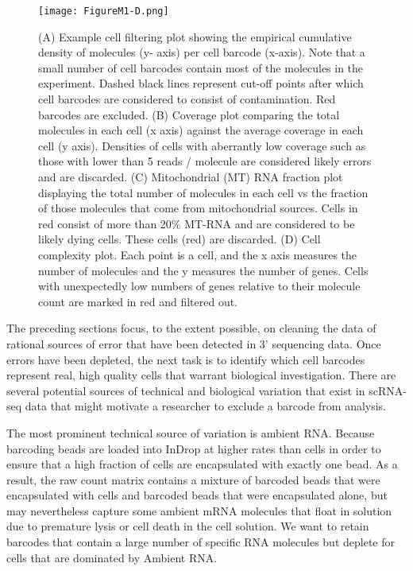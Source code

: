 \begin{figure}
\centering
\texttt{[image: FigureM1-D.png]}
\caption{(A) Example cell filtering plot showing the empirical cumulative density of molecules (y- axis) per cell barcode (x-axis). Note that a small number of cell barcodes contain most of the molecules in the experiment. Dashed black lines represent cut-off points after which cell barcodes are considered to consist of contamination. Red barcodes are excluded.  
(B) Coverage plot comparing the total molecules in each cell (x axis) against the average coverage in each cell (y axis). Densities of cells with aberrantly low coverage such as those with lower than 5 reads / molecule are considered likely errors and are discarded.  
(C) Mitochondrial (MT) RNA fraction plot displaying the total number of molecules in each cell vs the fraction of those molecules that come from mitochondrial sources. Cells in red consist of more than 20\% MT-RNA and are considered to be likely dying cells.  These cells (red) are discarded. 
(D) Cell complexity plot. Each point is a cell, and the x axis measures the number of molecules and the y measures the number of genes. Cells with unexpectedly low numbers of genes relative to their molecule count are marked in red and filtered out.}
\label{fig:m1d}
\end{figure}

The preceding sections focus, to the extent possible,  on cleaning the data of rational sources of error that have been detected in 3' sequencing data. 
Once errors have been depleted, the next task is to identify which cell barcodes represent real, high quality cells that warrant biological investigation. 
There are several potential sources of technical and biological variation that exist in scRNA-seq data that might motivate a researcher to exclude a barcode from analysis. 

The most prominent technical source of variation is ambient RNA\@. 
Because barcoding beads are loaded into InDrop at higher rates than cells in order to ensure that a high fraction of cells are encapsulated with exactly one bead. 
As a result, the raw count matrix contains a mixture of barcoded beads that were encapsulated with cells and barcoded beads that were encapsulated alone, but may nevertheless capture some ambient mRNA molecules that float in solution due to premature lysis or cell death in the cell solution. 
We want to retain barcodes that contain a large number of specific RNA molecules but deplete for cells that are dominated by Ambient RNA\@. 


